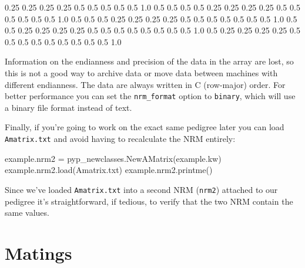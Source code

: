 \documentclass[
  letterpaper,
  DIV=11,
  numbers=noendperiod]{scrreprt}
\newenvironment{Shaded}{\begin{snugshade}}{\end{snugshade}}
\newcommand{\FloatTok}[1]{\textcolor[rgb]{0.68,0.00,0.00}{#1}}
\newcommand{\NormalTok}[1]{\textcolor[rgb]{0.00,0.23,0.31}{#1}}
\newcommand{\OperatorTok}[1]{\textcolor[rgb]{0.37,0.37,0.37}{#1}}
\newcommand{\StringTok}[1]{\textcolor[rgb]{0.13,0.47,0.30}{#1}}
\begin{document}
\begin{Shaded}
\begin{Highlighting}[]
\FloatTok{0.25} \FloatTok{0.25} \FloatTok{0.25} \FloatTok{0.25} \FloatTok{0.5} \FloatTok{0.5} \FloatTok{0.5}  \FloatTok{0.5}  \FloatTok{0.5}  \FloatTok{1.0}  \FloatTok{0.5}  \FloatTok{0.5}  \FloatTok{0.5}  \FloatTok{0.5}
\FloatTok{0.25} \FloatTok{0.25} \FloatTok{0.25} \FloatTok{0.25} \FloatTok{0.5} \FloatTok{0.5} \FloatTok{0.5}  \FloatTok{0.5}  \FloatTok{0.5}  \FloatTok{0.5}  \FloatTok{1.0}  \FloatTok{0.5}  \FloatTok{0.5}  \FloatTok{0.5}
\FloatTok{0.25} \FloatTok{0.25} \FloatTok{0.25} \FloatTok{0.25} \FloatTok{0.5} \FloatTok{0.5} \FloatTok{0.5}  \FloatTok{0.5}  \FloatTok{0.5}  \FloatTok{0.5}  \FloatTok{0.5}  \FloatTok{1.0}  \FloatTok{0.5}  \FloatTok{0.5}
\FloatTok{0.25} \FloatTok{0.25} \FloatTok{0.25} \FloatTok{0.25} \FloatTok{0.5} \FloatTok{0.5} \FloatTok{0.5}  \FloatTok{0.5}  \FloatTok{0.5}  \FloatTok{0.5}  \FloatTok{0.5}  \FloatTok{0.5}  \FloatTok{1.0}  \FloatTok{0.5}
\FloatTok{0.25} \FloatTok{0.25} \FloatTok{0.25} \FloatTok{0.25} \FloatTok{0.5} \FloatTok{0.5} \FloatTok{0.5}  \FloatTok{0.5}  \FloatTok{0.5}  \FloatTok{0.5}  \FloatTok{0.5}  \FloatTok{0.5}  \FloatTok{0.5}  \FloatTok{1.0}
\end{Highlighting}
\end{Shaded}

Information on the endianness and precision of the data in the array are
lost, so this is not a good way to archive data or move data between
machines with different endianness. The data are always written in C
(row-major) order. For better performance you can set the
\texttt{nrm\_format} option to \texttt{binary}, which will use a binary
file format instead of text.

Finally, if you're going to work on the exact same pedigree later you
can load \texttt{Amatrix.txt} and avoid having to recalculate the NRM
entirely:

\begin{Shaded}
\begin{Highlighting}[]
\NormalTok{example.nrm2 }\OperatorTok{=}\NormalTok{ pyp\_newclasses.NewAMatrix(example.kw)}
\NormalTok{example.nrm2.load(}\StringTok{\textquotesingle{}Amatrix.txt\textquotesingle{}}\NormalTok{)}
\NormalTok{example.nrm2.printme()}
\end{Highlighting}
\end{Shaded}

Since we've loaded \texttt{Amatrix.txt} into a second NRM
(\texttt{nrm2}) attached to our pedigree it's straightforward, if
tedious, to verify that the two NRM contain the same values.

\section{Matings}\label{sec-computing-matings}
\end{document}
